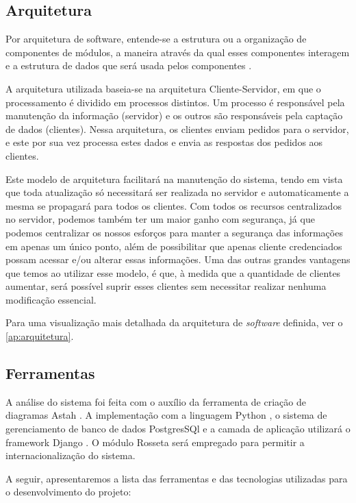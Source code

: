 \subsection{Arquitetura}
Por arquitetura de software, entende-se a estrutura ou a organização de componentes de módulos, a maneira através da qual esses componentes interagem e a estrutura de dados que será usada pelos componentes \cite{pressman2006engenharia}.

A arquitetura utilizada baseia-se na arquitetura Cliente-Servidor\cite{david2013everything}, em que o processamento é dividido em processos distintos. Um processo é responsável pela manutenção da 
informação (servidor) e os outros são responsáveis pela captação de dados (clientes). Nessa arquitetura, os clientes enviam pedidos para o servidor, e este por sua vez processa estes dados e envia as 
respostas dos pedidos aos clientes.

Este modelo de arquitetura facilitará na manutenção do sistema, tendo em vista que toda atualização só necessitará ser realizada no servidor e automaticamente a mesma se propagará para todos os 
clientes. Com todos os recursos centralizados no servidor, podemos também ter um maior ganho com segurança, já que podemos centralizar os nossos esforços para manter a segurança das informações em 
apenas um único ponto, além de possibilitar que apenas cliente credenciados possam acessar e/ou alterar essas informações. Uma das outras grandes vantagens que temos  ao utilizar esse modelo, é que, 
\`a medida que a quantidade de clientes aumentar, será possível suprir esses clientes sem necessitar realizar nenhuma modificação essencial.

Para uma visualização mais detalhada da arquitetura de \textit{software} definida, ver o  \autoref{ap:arquitetura}.

\subsection{Ferramentas}

A análise do sistema foi feita com o auxílio da ferramenta de criação de diagramas Astah \cite{astah2016}. A implementação com a linguagem 
Python \cite{vanrossum2010python}, o sistema de gerenciamento de banco de dados PostgresSQl \cite{momjian2001postgresql} e a camada de 
aplicação utilizar\'a o framework Django \cite{django2016}. O módulo Rosseta \cite{rosetta2016} ser\'a empregado 
para permitir a internacionalização do sistema.
 
A seguir, apresentaremos a lista das ferramentas e das tecnologias utilizadas para o desenvolvimento do projeto:

